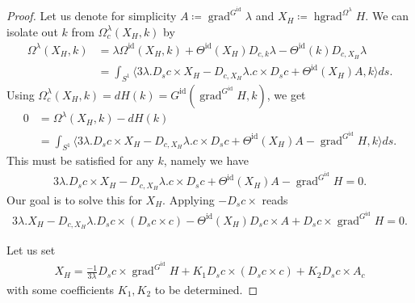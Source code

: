 \documentclass[12pt]{amsart}
\newcommand{\AuthorCOMMENT}[3]{\textcolor{#2}{{[\textbf{#1:} \textsl{#3}}]}}  %
\newcommand{\cSI}[1]{\AuthorCOMMENT{Sadashige}{violet}{#1}}
\theoremstyle{definition}
\newcommand{\id}{\mathrm{id}}
\def\la{\lambda}
\def\Th{\Theta}
\def\Om{\Omega}
\def\x{\times}
\let\on=\operatorname
\begin{document}
\begin{proof}
Let us denote for simplicity $A\coloneqq \on{grad}^{G^\id}\la$ and $X_H\coloneqq \on{hgrad}^{\Om^\la}H$. 
We can isolate out $k$ from $\Om^\la_c (X_H,k)$ by
    \begin{align}
        \Om^\la (X_H,k)
        &=\la \Om^\id(X_H,k)+\Th^\id(X_H)D_{c,k}\la - \Th^\id(k)D_{c,X_H}\la\\
        &=\int_{S^1} \langle 3\la. D_s c \x X_H - D_{c,X_H}\la. c \x D_s c +\Th^\id (X_H) A, k\rangle ds.
    \end{align}
    Using $\Om^\la_c (X_H,k)=dH(k)=G^\id (\on{grad}^{G^\id} H,k)$, we get 
    \begin{align}
        0 &= \Om^\la (X_H,k) - dH(k)\\
        &=\int_{S^1} \langle 3\la. D_s c \x X_H - D_{c,X_H}\la. c \x D_s c +\Th^\id (X_H) A - \on{grad}^{G^\id} H, k\rangle ds.
    \end{align}
    This must be satisfied for any $k$, namely we have
    \begin{align}\label{eq:equation_with_XH}
        3\la.D_s c \x X_H - D_{c,X_H}\la. c \x D_s c +\Th^\id (X_H) A - \on{grad}^{G^\id} H=0.
    \end{align}
    Our goal is to solve this for $X_H$. Applying $- D_s c \x$ reads
    \begin{align}\label{eq:equation_in_XH}
       3\la. X_H - D_{c,X_H}\la. D_s c \x( D_s c \x c) -\Th^\id (X_H) D_s c\x A + D_s c \x \on{grad}^{G^\id} H=0.
    \end{align}
    
    Let us set 
    \begin{align}\label{eq:temporal_XH}
        X_H=\frac{-1}{3\la} D_s c \x \on{grad}^{G^\id} H + K_1 D_s c \x( D_s c \x c) +K_2 D_s c \x A_c
    \end{align}
    with some coefficients $K_1, K_2$ to be determined. 
    

\end{proof}
\end{document}
